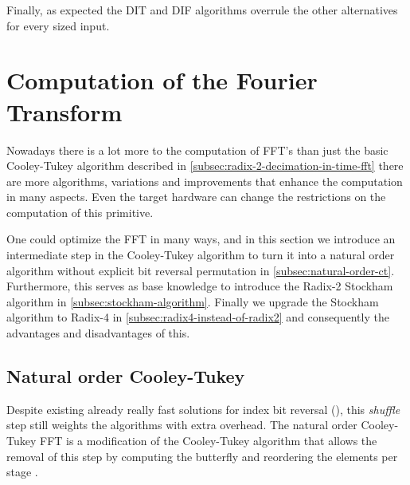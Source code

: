 \documentclass[
  oneside,
  11pt, a4paper,
  footinclude=true,
  headinclude=true,
  cleardoublepage=empty
]{scrbook}
\begin{document}
Finally, as expected the DIT and DIF algorithms overrule the other alternatives for every sized input.



\chapter{Computation of the Fourier Transform}


Nowadays there is a lot more to the computation of FFT's than just the basic Cooley-Tukey algorithm described in \autoref{subsec:radix-2-decimation-in-time-fft} there are more algorithms, variations and improvements that enhance the computation in many aspects. Even the target hardware can change the restrictions on the computation of this primitive.

One could optimize the FFT in many ways, and in this section we introduce an intermediate step in the Cooley-Tukey algorithm to turn it into a natural order algorithm without explicit bit reversal permutation in \autoref{subsec:natural-order-ct}. Furthermore, this serves as base knowledge to introduce the Radix-2 Stockham algorithm in \autoref{subsec:stockham-algorithm}. Finally we upgrade the Stockham algorithm to Radix-4 in \autoref{subsec:radix4-instead-of-radix2} and consequently the advantages and disadvantages of this.


\section{Natural order Cooley-Tukey} \label{subsec:natural-order-ct}


Despite existing already really fast solutions for index bit reversal (\cite{prado2004new}), this \textit{shuffle} step still weights the algorithms with extra overhead. The natural order Cooley-Tukey FFT is a modification of the Cooley-Tukey algorithm that allows the removal of this step by computing the butterfly and reordering the elements per stage \cite{OTFFTnoct}.
\end{document}

